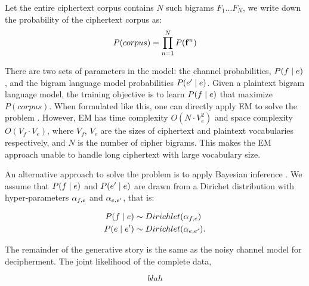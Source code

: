 Let the entire ciphertext corpus contains $N$ such bigrams $F_{1}...F_{N}$, we write down the probability of the ciphertext corpus as:
%
\[
\label{p_corpus}
P(corpus) =  \prod_{n=1}^{N} P(\mathbf{f}^{n})
\]
%

There are two sets of parameters in the model: the channel probabilities, $P(f \mid e)$, and the bigram language model probabilities $P(e' \mid e)$. Given a plaintext bigram language model, the training objective is to learn $P(f \mid e)$ that maximize $P(corpus)$. When formulated like this, one can directly apply EM to solve the problem \cite{knight-EtAl:2006}. However, EM has time complexity $O( N\cdot V_{e}^{2})$ and space complexity $O(V_{f}\cdot V_{e})$, where $V_{f}$, $V_{e}$ are the sizes of ciphertext and plaintext vocabularies respectively, and $N$ is the number of cipher bigrams. This makes the EM approach unable to handle long ciphertext with large vocabulary size. 

An alternative approach to solve the problem is to apply Bayesian inference \cite{ravi-knight:2011,Dou:2012}. We assume that $P(f \mid e)$ and $P(e' \mid e)$ are drawn from a Dirichet distribution with hyper-parameters $\alpha_{f,e}$ and $\alpha_{e,e'}$, that is: 

\begin{align*}
P(f \mid e) & \sim Dirichlet(\alpha_{f,e}) \\ 
P(e \mid e') & \sim Dirichlet(\alpha_{e,e'}).
\end{align*}

The remainder of the generative story is the same as the noisy channel model for decipherment. The joint likelihood of the complete data, 

\begin{equation}
blah
\end{equation}

